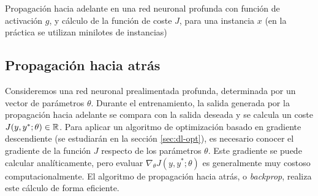 \begin{algorithm}
\caption{Propagación hacia adelante en una red neuronal profunda con función de activación $g$, y cálculo de la función de coste $J$, para una instancia $x$ (en la práctica se utilizan minilotes de instancias)}
\label{alg:fwdprop}
\begin{algorithmic}
  \ENDFOR
\end{algorithmic}
\end{algorithm}

\subsection{Propagación hacia
atrás}\label{sec:backprop}

Consideremos una red neuronal prealimentada profunda, determinada por un
vector de parámetros \(\theta\). Durante el entrenamiento, la salida
generada por la propagación hacia adelante se compara con la salida
deseada y se calcula un coste \(J(y,y^{*};\theta)\in\mathbb{R}\). Para aplicar
un algoritmo de optimización basado en gradiente descendiente (se
estudiarán en la sección \ref{sec:dl-opt}), es necesario conocer el
gradiente de la función \(J\) respecto de los parámetros \(\theta\).
Este gradiente se puede calcular analíticamente, pero evaluar
\(\nabla_{\theta} J(y,y^{*};\theta)\) es generalmente muy costoso
computacionalmente. El algoritmo de propagación hacia atrás, o
\emph{backprop}, realiza este cálculo de forma eficiente.

